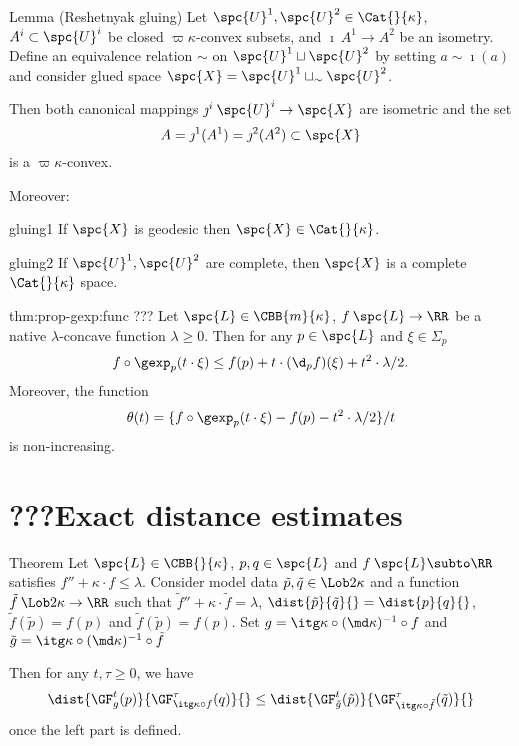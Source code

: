 \begin{thm}{Lemma (Reshetnyak gluing)}\label{lem:cba-gluing}
Let $\spc{U}^1, \spc{U}^2\in\Cat{}{\kappa}$,  
$A^i\subset\spc{U}^i$ be closed $\varpi\kappa$-convex subsets, and  $\imath\:A^1\to A^2$ be an isometry.
Define an equivalence relation $\sim$ on $\spc{U}^1\sqcup \spc{U}^2$  by setting $a\sim\imath(a)$ and consider glued space $\spc{X}=\spc{U}^1\sqcup_\sim \spc{U}^2$.

Then both canonical mappings $\jmath^i\:\spc{U}^i\to\spc{X}$ are isometric 
and the set
$$A=\jmath^1(A^1)=\jmath^2(A^2)\subset\spc{X}$$ 
is a $\varpi\kappa$-convex.

Moreover:

\begin{subthm}{gluing1}
If $\spc{X}$ is geodesic then $\spc{X}\in\Cat{}{\kappa}$.
\end{subthm} 
 
\begin{subthm}{gluing2}
If $\spc{U}^1, \spc{U}^2$ are complete, 
then $\spc{X}$ is a complete $\Cat{}{\kappa}$ space.
 \end{subthm} 
\end{thm}










\begin{subthm}{thm:prop-gexp:func} 
??? 
Let $\spc{L}\in \CBB{m}{\kappa}$,  
$f\:\spc{L}\to\RR$ be a native $\lambda$-concave function $\lambda\ge 0$. 
Then for any $p\in \spc{L}$ and $\xi\in \Sigma_p$
$$f\circ\gexp_p(t\cdot\xi)
\le 
f(p)+t\cdot(\d_p f)(\xi)+t^2\cdot\lambda/2.$$
Moreover, the function
$$\theta(t)=\{f\circ\gexp_p(t\cdot\xi)-f(p)-t^2\cdot\lambda/2\}/t$$
is non-increasing.
\end{subthm}









\section{???Exact distance estimates}

\begin{thm}{Theorem}
Let $\spc{L}\in\CBB{}{\kappa}$,
$p,q\in\spc{L}$
and $f\:\spc{L}\subto\RR$ satisfies $f''+\kappa\cdot  f\le \lambda$.
Consider model data
$\tilde p,\tilde q\in \Lob2{\kappa}$ and a function $\tilde f\:\Lob2{\kappa}\to \RR$ such that $\tilde f''+\kappa\cdot \tilde f= \lambda$, $\dist{\tilde p}{\tilde q}{}=\dist{p}{q}{}$, $\tilde f(\tilde p)=f(p)$ and 		$\tilde f(\tilde p)=f(p)$.
Set $g=\itg\kappa\circ(\md\kappa)^{-1}\circ f$ and $\tilde g=\itg\kappa\circ(\md\kappa)^{-1}\circ \tilde f$

Then for any $t,\tau\ge 0$, we have
$$\dist{\GF_{g}^t(p)}{\GF_{\itg\kappa\circ f}^\tau(q)}{}
\le
\dist{\GF_{\tilde g}^t(\tilde p)}{\GF_{\itg\kappa\circ \tilde f}^\tau(\tilde q)}{}$$ 
once the left part is defined.
\end{thm}

